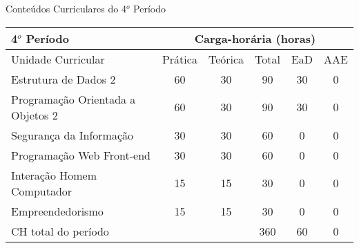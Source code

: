\begin{quadro}[ht!]
\centering
\caption{Conteúdos Curriculares do 4$^o$ Período}\label{qua:periodo4}
\begin{tabular}{|p{8.0cm}|c|c|c|c|c|}
\hline
\rowcolor{blue1} 4$^o$ Período & \multicolumn{5}{|c|}{\centering Carga-horária (horas)} \\ \hline
\rowcolor{blue1} Unidade Curricular & Prática & Teórica & Total & EaD & AAE \\ \hline
Estrutura de Dados 2 & 60 & 30 & 90 & 30	&	0 \\	\hline
Programação Orientada a Objetos 2 & 60 & 30 & 90 & 30	&	0 \\	\hline
Segurança da Informação & 30 & 30 & 60 & 0	&	0 \\	\hline
Programação Web Front-end & 30 & 30 & 60 & 0	&	0 \\	\hline
Interação Homem Computador & 15 & 15 & 30 & 0	&	0 \\	\hline
Empreendedorismo & 15 & 15 & 30 & 0	&	0 \\	\hline
CH total do período & \multicolumn{2}{p{3.3cm}|}{\cellcolor{blue1}} & 360 & 60	&	0 \\ \hline
 \end{tabular} \end{quadro}